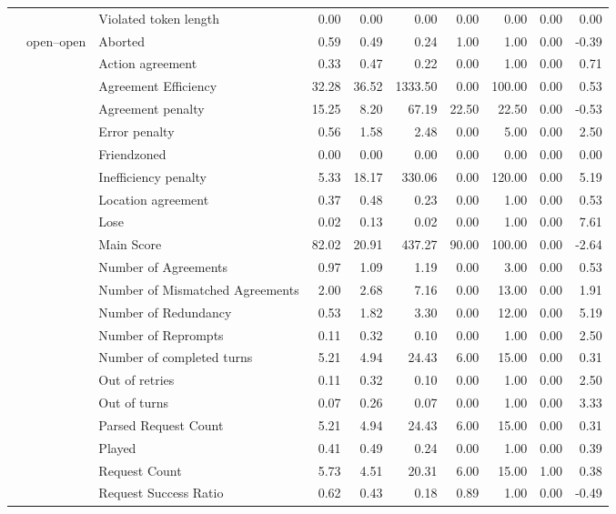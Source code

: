 \begin{tabular}{lllrrrrrrr}
 &  & Violated token length & 0.00 & 0.00 & 0.00 & 0.00 & 0.00 & 0.00 & 0.00 \\
\cline{2-10}
 & \multirow[t]{27}{*}{open--open} & Aborted & 0.59 & 0.49 & 0.24 & 1.00 & 1.00 & 0.00 & -0.39 \\
 &  & Action agreement & 0.33 & 0.47 & 0.22 & 0.00 & 1.00 & 0.00 & 0.71 \\
 &  & Agreement Efficiency & 32.28 & 36.52 & 1333.50 & 0.00 & 100.00 & 0.00 & 0.53 \\
 &  & Agreement penalty & 15.25 & 8.20 & 67.19 & 22.50 & 22.50 & 0.00 & -0.53 \\
 &  & Error penalty & 0.56 & 1.58 & 2.48 & 0.00 & 5.00 & 0.00 & 2.50 \\
 &  & Friendzoned & 0.00 & 0.00 & 0.00 & 0.00 & 0.00 & 0.00 & 0.00 \\
 &  & Inefficiency penalty & 5.33 & 18.17 & 330.06 & 0.00 & 120.00 & 0.00 & 5.19 \\
 &  & Location agreement & 0.37 & 0.48 & 0.23 & 0.00 & 1.00 & 0.00 & 0.53 \\
 &  & Lose & 0.02 & 0.13 & 0.02 & 0.00 & 1.00 & 0.00 & 7.61 \\
 &  & Main Score & 82.02 & 20.91 & 437.27 & 90.00 & 100.00 & 0.00 & -2.64 \\
 &  & Number of Agreements & 0.97 & 1.09 & 1.19 & 0.00 & 3.00 & 0.00 & 0.53 \\
 &  & Number of Mismatched Agreements & 2.00 & 2.68 & 7.16 & 0.00 & 13.00 & 0.00 & 1.91 \\
 &  & Number of Redundancy & 0.53 & 1.82 & 3.30 & 0.00 & 12.00 & 0.00 & 5.19 \\
 &  & Number of Reprompts & 0.11 & 0.32 & 0.10 & 0.00 & 1.00 & 0.00 & 2.50 \\
 &  & Number of completed turns & 5.21 & 4.94 & 24.43 & 6.00 & 15.00 & 0.00 & 0.31 \\
 &  & Out of retries & 0.11 & 0.32 & 0.10 & 0.00 & 1.00 & 0.00 & 2.50 \\
 &  & Out of turns & 0.07 & 0.26 & 0.07 & 0.00 & 1.00 & 0.00 & 3.33 \\
 &  & Parsed Request Count & 5.21 & 4.94 & 24.43 & 6.00 & 15.00 & 0.00 & 0.31 \\
 &  & Played & 0.41 & 0.49 & 0.24 & 0.00 & 1.00 & 0.00 & 0.39 \\
 &  & Request Count & 5.73 & 4.51 & 20.31 & 6.00 & 15.00 & 1.00 & 0.38 \\
 &  & Request Success Ratio & 0.62 & 0.43 & 0.18 & 0.89 & 1.00 & 0.00 & -0.49 \\

\end{tabular}
